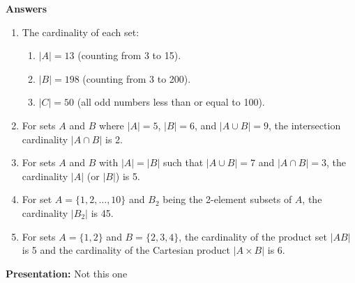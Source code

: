 \documentclass{article}
\begin{document}
\noindent\textbf{Answers} 


\begin{enumerate}
    \item The cardinality of each set:
    \begin{enumerate}
        \item \( |A| = 13 \) (counting from 3 to 15).
        \item \( |B| = 198 \) (counting from 3 to 200).
        \item \( |C| = 50 \) (all odd numbers less than or equal to 100).
    \end{enumerate}
    
    \item For sets \( A \) and \( B \) where \( |A| = 5 \), \( |B| = 6 \), and \( |A \cup B| = 9 \), the intersection cardinality \( |A \cap B| \) is 2.
    
    \item For sets \( A \) and \( B \) with \( |A| = |B| \) such that \( |A \cup B| = 7 \) and \( |A \cap B| = 3 \), the cardinality \( |A| \) (or \( |B| \)) is 5.
    
    \item For set \( A = \{1, 2, \ldots, 10\} \) and \( B_2 \) being the 2-element subsets of \( A \), the cardinality \( |B_2| \) is 45.
    
    \item For sets \( A = \{1, 2\} \) and \( B = \{2, 3, 4\} \), the cardinality of the product set \( |AB| \) is 5 and the cardinality of the Cartesian product \( |A \times B| \) is 6.
\end{enumerate}

\noindent\textbf{Presentation:} Not this one

\vspace{0.5cm} %
\end{document}

